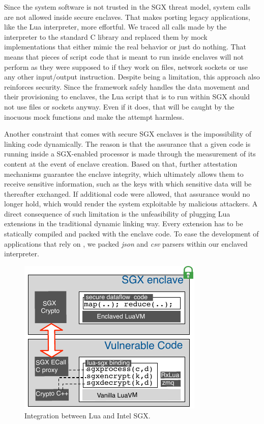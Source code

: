Since the system software is not trusted in the SGX threat model, system calls are not allowed inside secure enclaves.
That makes porting legacy applications, like the Lua interpreter, more effortful.
We traced all calls made by the interpreter to the standard C library and replaced them by mock implementations that either mimic the real behavior or just do nothing.
That means that pieces of script code that is meant to run inside enclaves will not perform as they were supposed to if they work on files, network sockets or use any other input/output instruction.
Despite being a limitation, this approach also reinforces security. 
Since the framework safely handles the data movement and their provisioning to enclaves, the Lua script that is to run within SGX should not use files or sockets anyway.
Even if it does, that will be caught by the inocuous mock functions and make the attempt harmless.

Another constraint that comes with secure SGX enclaves is the impossibility of linking code dynamically. 
The reason is that the assurance that a given code is running inside a SGX-enabled processor is made through the measurement of its content at the event of enclave creation.
Based on that, further attestation mechanisms guarantee the enclave integrity, which ultimately allows them to receive sensitive information, such as the keys with which sensitive data will be thereafter exchanged. 
If additional code were allowed, that assurance would no longer hold, which would render the system exploitable by malicious attackers.
A direct consequence of such limitation is the unfeasibility of plugging Lua extensions in the traditional dynamic linking way. Every extension has to be statically compiled and packed with the enclave code. To ease the development of applications that rely on \SYS{}, we packed \emph{json} and \emph{csv} parsers within our enclaved interpreter.

\begin{figure}[t!]
  \centering
  \includegraphics[scale=0.85]{images/arch-sgxlua.pdf}
  \caption{Integration between Lua and Intel SGX.}
  \label{fig:arch-luasgx}
\end{figure}


